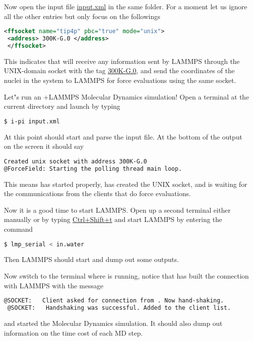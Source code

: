 \documentclass{article}
\begin{document}
\begin{Exercise}[label={i-pi},title={Molecular Dynamics: a client/server approach}]
\Question
Now open the \ipi{} input file \url{input.xml} in the same folder.
For a moment let us ignore all the other entries but only focus on the followings
\begin{lstlisting}[language=xml]
 <ffsocket name="tip4p" pbc="true" mode="unix">
 <address> 300K-G.0 </address>
 </ffsocket>
\end{lstlisting}
This indicates that \ipi{} will receive any information sent by LAMMPS through the UNIX-domain socket with the tag \url{300K-G.0},
and send the coordinates of the nuclei in the system to LAMMPS for force evaluations using the same socket.

\Question
Let"s run an \ipi{}+LAMMPS Molecular Dynamics simulation!
Open a terminal at the current directory and
launch \ipi{} by typing
\begin{lstlisting}[language=bash]
$ i-pi input.xml
\end{lstlisting}
At this point \ipi{} should start 
and parse the input file. At the bottom of the output on the screen it should say
\begin{lstlisting}[language=bash]
Created unix socket with address 300K-G.0
@ForceField: Starting the polling thread main loop.
\end{lstlisting}
This means \ipi{} has started properly, has created the UNIX socket, and is waiting for the communications from the clients that do force evaluations.

\Question
Now it is a good time to start LAMMPS.
Open up a second terminal either manually or by typing \url{Ctrl+Shift+t}
and start LAMMPS by entering the command
\begin{lstlisting}[language=bash]
$ lmp_serial < in.water
\end{lstlisting}
Then LAMMPS should start and dump out some outputs.

\Question
Now switch to the terminal where \ipi{} is running, notice that \ipi{} has built the connection with LAMMPS with the message
\begin{lstlisting}[language=sh]
 @SOCKET:   Client asked for connection from . Now hand-shaking.
 @SOCKET:   Handshaking was successful. Added to the client list.
\end{lstlisting}
and started the Molecular Dynamics simulation.
It should also dump out information on the time cost of each MD step.


\end{Exercise}
\end{document}
